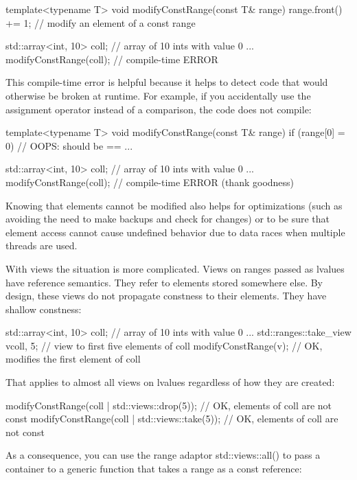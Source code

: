 \begin{cpp}
template<typename T>
void modifyConstRange(const T& range)
{
	range.front() += 1; // modify an element of a const range
}

std::array<int, 10> coll{}; // array of 10 ints with value 0
...
modifyConstRange(coll); // compile-time ERROR
\end{cpp}

This compile-time error is helpful because it helps to detect code that would otherwise be broken at runtime. For example, if you accidentally use the assignment operator instead of a comparison, the code does not compile:

\begin{cpp}
template<typename T>
void modifyConstRange(const T& range)
{
	if (range[0] = 0) { // OOPS: should be ==
		...
	}
}

std::array<int, 10> coll{}; // array of 10 ints with value 0
...
modifyConstRange(coll); // compile-time ERROR (thank goodness)
\end{cpp}

Knowing that elements cannot be modified also helps for optimizations (such as avoiding the need to make backups and check for changes) or to be sure that element access cannot cause undefined behavior due to data races when multiple threads are used.

With views the situation is more complicated. Views on ranges passed as lvalues have reference semantics. They refer to elements stored somewhere else. By design, these views do not propagate constness to their elements. They have shallow constness:

\begin{cpp}
std::array<int, 10> coll{}; // array of 10 ints with value 0
...
std::ranges::take_view v{coll, 5}; // view to first five elements of coll
modifyConstRange(v); // OK, modifies the first element of coll
\end{cpp}

That applies to almost all views on lvalues regardless of how they are created:

\begin{cpp}
modifyConstRange(coll | std::views::drop(5)); // OK, elements of coll are not const
modifyConstRange(coll | std::views::take(5)); // OK, elements of coll are not const
\end{cpp}

As a consequence, you can use the range adaptor std::views::all() to pass a container to a generic function that takes a range as a const reference:

